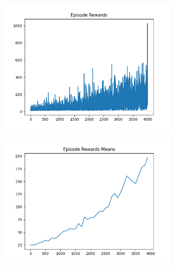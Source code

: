 \begin{figure}[H]
    \centering
    \begin{subfigure}{.47\linewidth}
        \centering
        \includegraphics[width=\textwidth]{pole/2024-06-14_15-38-10_dqn_cartpole_episode_rewards.png}
    \end{subfigure}
    \begin{subfigure}{.47\linewidth}
        \centering
        \includegraphics[width=\textwidth]{pole/2024-06-14_15-38-10_dqn_cartpole_episode_rewards_means.png}
    \end{subfigure}
    \begin{subfigure}{.47\linewidth}
        \centering

\end{subfigure}
\end{figure}
